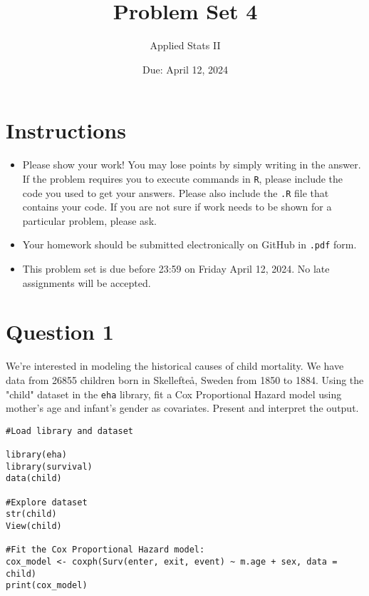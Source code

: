 \documentclass[12pt,letterpaper]{article}
\title{Problem Set 4}
\date{Due: April 12, 2024}
\author{Applied Stats II}
\begin{document}
	\maketitle
	\section*{Instructions}
	\begin{itemize}
	\item Please show your work! You may lose points by simply writing in the answer. If the problem requires you to execute commands in \texttt{R}, please include the code you used to get your answers. Please also include the \texttt{.R} file that contains your code. If you are not sure if work needs to be shown for a particular problem, please ask.
	\item Your homework should be submitted electronically on GitHub in \texttt{.pdf} form.
	\item This problem set is due before 23:59 on Friday April 12, 2024. No late assignments will be accepted.
	\end{itemize}

	\vspace{.25cm}
\section*{Question 1}
\vspace{.25cm}
\noindent We're interested in modeling the historical causes of child mortality. We have data from 26855 children born in Skellefteå, Sweden from 1850 to 1884. Using the "child" dataset in the \texttt{eha} library, fit a Cox Proportional Hazard model using mother's age and infant's gender as covariates. Present and interpret the output.



\begin{lstlisting}	
#Load library and dataset

library(eha)
library(survival)
data(child)

#Explore dataset
str(child)
View(child)

#Fit the Cox Proportional Hazard model:
cox_model <- coxph(Surv(enter, exit, event) ~ m.age + sex, data = child)
print(cox_model)
\end{lstlisting}	
	
\end{document}
